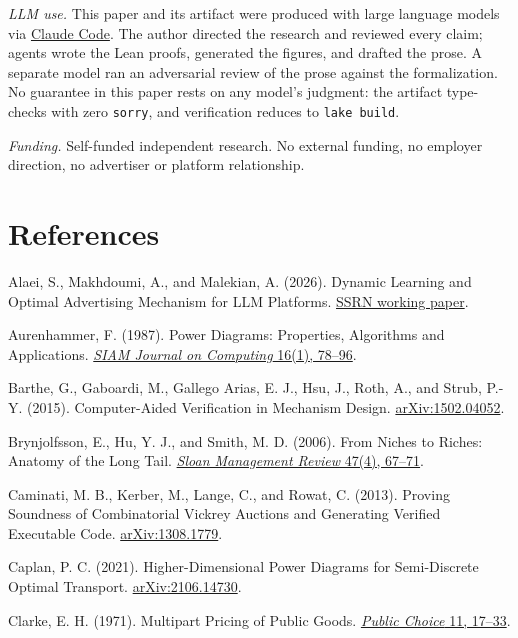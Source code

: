 \emph{LLM use.} This paper and its artifact were produced with large
language models via \href{https://claude.ai/claude-code}{Claude Code}.
The author directed the research and reviewed every claim; agents wrote
the Lean proofs, generated the figures, and drafted the prose. A
separate model ran an adversarial review of the prose against the
formalization. No guarantee in this paper rests on any model's judgment:
the artifact type-checks with zero \texttt{sorry}, and verification
reduces to \texttt{lake\ build}.

\emph{Funding.} Self-funded independent research. No external funding,
no employer direction, no advertiser or platform relationship.

\section*{References}\label{references}

Alaei, S., Makhdoumi, A., and Malekian, A. (2026). Dynamic Learning and
Optimal Advertising Mechanism for LLM Platforms.
\href{https://papers.ssrn.com/sol3/papers.cfm?abstract_id=6212838}{SSRN
working paper}.

Aurenhammer, F. (1987). Power Diagrams: Properties, Algorithms and
Applications. \href{https://doi.org/10.1137/0216006}{\emph{SIAM Journal
on Computing} 16(1), 78--96}.

Barthe, G., Gaboardi, M., Gallego Arias, E. J., Hsu, J., Roth, A., and
Strub, P.-Y. (2015). Computer-Aided Verification in Mechanism Design.
\href{https://arxiv.org/abs/1502.04052}{arXiv:1502.04052}.

Brynjolfsson, E., Hu, Y. J., and Smith, M. D. (2006). From Niches to
Riches: Anatomy of the Long Tail.
\href{https://sloanreview.mit.edu/article/from-niches-to-riches-anatomy-of-the-long-tail/}{\emph{Sloan
Management Review} 47(4), 67--71}.

Caminati, M. B., Kerber, M., Lange, C., and Rowat, C. (2013). Proving
Soundness of Combinatorial Vickrey Auctions and Generating Verified
Executable Code.
\href{https://arxiv.org/abs/1308.1779}{arXiv:1308.1779}.

Caplan, P. C. (2021). Higher-Dimensional Power Diagrams for
Semi-Discrete Optimal Transport.
\href{https://arxiv.org/abs/2106.14730}{arXiv:2106.14730}.

Clarke, E. H. (1971). Multipart Pricing of Public Goods.
\href{https://doi.org/10.1007/BF01726210}{\emph{Public Choice} 11,
17--33}.

